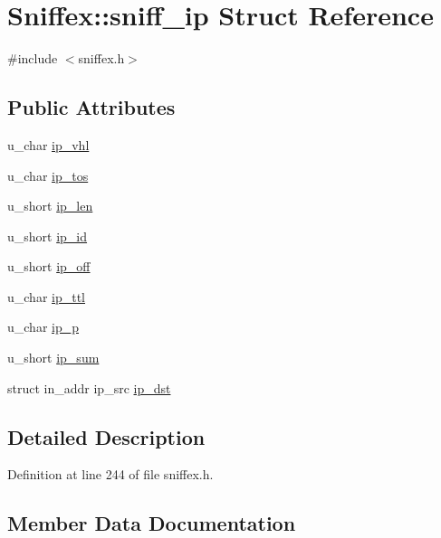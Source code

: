 \hypertarget{struct_sniffex_1_1sniff__ip}{}\section{Sniffex\+:\+:sniff\+\_\+ip Struct Reference}
\label{struct_sniffex_1_1sniff__ip}


{\ttfamily \#include $<$sniffex.\+h$>$}

\subsection*{Public Attributes}
\begin{DoxyCompactItemize}
\item 
u\+\_\+char \hyperlink{struct_sniffex_1_1sniff__ip_a64daddec106d5178ffbfe2f07378e438}{ip\+\_\+vhl}
\item 
u\+\_\+char \hyperlink{struct_sniffex_1_1sniff__ip_a2cfa668bb5e7079cc05e0d19d95b3816}{ip\+\_\+tos}
\item 
u\+\_\+short \hyperlink{struct_sniffex_1_1sniff__ip_a8ae9deed5b399601307bca07dc59054a}{ip\+\_\+len}
\item 
u\+\_\+short \hyperlink{struct_sniffex_1_1sniff__ip_a98026bc0aad86b837f246635ed9b25df}{ip\+\_\+id}
\item 
u\+\_\+short \hyperlink{struct_sniffex_1_1sniff__ip_aa66ee179c411c56586369198edcc7b43}{ip\+\_\+off}
\item 
u\+\_\+char \hyperlink{struct_sniffex_1_1sniff__ip_aea2468d9918eb811586acb71de6870ef}{ip\+\_\+ttl}
\item 
u\+\_\+char \hyperlink{struct_sniffex_1_1sniff__ip_a2c06fbd06dc42564a398cec20a6b15b9}{ip\+\_\+p}
\item 
u\+\_\+short \hyperlink{struct_sniffex_1_1sniff__ip_ab50c5a07d672683f1039ba5edcd7d583}{ip\+\_\+sum}
\item 
struct in\+\_\+addr ip\+\_\+src \hyperlink{struct_sniffex_1_1sniff__ip_abf8550a1a90663dc9f529f50ecee72ee}{ip\+\_\+dst}
\end{DoxyCompactItemize}


\subsection{Detailed Description}


Definition at line 244 of file sniffex.\+h.



\subsection{Member Data Documentation}
\mbox{\label{struct_sniffex_1_1sniff__ip_abf8550a1a90663dc9f529f50ecee72ee}} 
